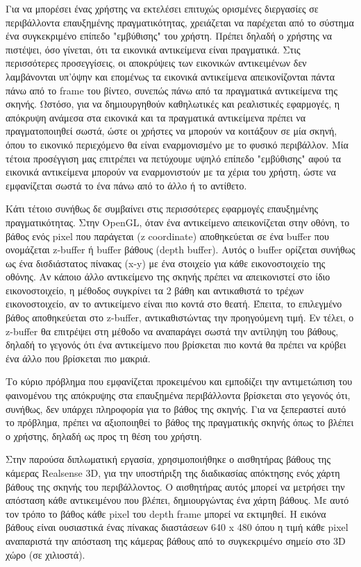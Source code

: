 Για να μπορέσει ένας χρήστης να εκτελέσει επιτυχώς ορισμένες διεργασίες σε περιβάλλοντα επαυξημένης πραγματικότητας, χρειάζεται να παρέχεται από το σύστημα ένα συγκεκριμένο επίπεδο "εμβύθισης" του χρήστη. Πρέπει δηλαδή ο χρήστης να πιστέψει, όσο γίνεται, ότι τα εικονικά αντικείμενα είναι πραγματικά. 
Στις περισσότερες προσεγγίσεις, οι αποκρύψεις των εικονικών αντικειμένων δεν λαμβάνονται υπ'όψην και επομένως τα εικονικά αντικείμενα απεικονίζονται πάντα πάνω από το frame του βίντεο, συνεπώς πάνω από τα πραγματικά αντικείμενα της σκηνής. 
Ωστόσο, για να δημιουργηθούν καθηλωτικές και ρεαλιστικές εφαρμογές, η απόκρυψη ανάμεσα στα εικονικά και τα πραγματικά αντικείμενα πρέπει να πραγματοποιηθεί σωστά, ώστε οι χρήστες να μπορούν να κοιτάξουν σε μία σκηνή, όπου το εικονικό περιεχόμενο θα είναι εναρμονισμένο με το φυσικό περιβάλλον. Μία τέτοια προσέγγιση μας επιτρέπει να πετύχουμε υψηλό επίπεδο "εμβύθισης" αφού τα εικονικά αντικείμενα μπορούν να εναρμονιστούν με τα χέρια του χρήστη, ώστε να εμφανίζεται σωστά το ένα πάνω από το άλλο ή το αντίθετο. 

Κάτι τέτοιο συνήθως δε συμβαίνει στις περισσότερες εφαρμογές επαυξημένης πραγματικότητας. Στην OpenGL, όταν ένα αντικείμενο απεικονίζεται στην οθόνη, το βάθος ενός pixel που παράγεται (z coordinate) αποθηκεύεται σε ένα buffer που ονομάζεται z-buffer ή buffer βάθους (depth buffer). Αυτός ο buffer ορίζεται συνήθως ως ένα δισδιάστατος πίνακας (x-y) με ένα στοιχείο για κάθε εικονοστοιχείο της οθόνης. Αν κάποιο άλλο αντικείμενο της σκηνής πρέπει να απεικονιστεί στο ίδιο εικονοστοιχείο, η μέθοδος συγκρίνει τα 2 βάθη και αντικαθιστά το τρέχων εικονοστοιχείο, αν το αντικείμενο είναι πιο κοντά στο θεατή. Έπειτα, το επιλεγμένο βάθος αποθηκεύεται στο z-buffer, αντικαθιστώντας την προηγούμενη τιμή. Εν τέλει, ο z-buffer θα επιτρέψει στη μέθοδο να αναπαράγει σωστά την αντίληψη του βάθους, δηλαδή το γεγονός ότι ένα αντικείμενο που βρίσκεται πιο κοντά θα πρέπει να κρύβει ένα άλλο που βρίσκεται πιο μακριά.


Το κύριο πρόβλημα που εμφανίζεται προκειμένου και εμποδίζει την αντιμετώπιση του φαινομένου της απόκρυψης στα επαυξημένα περιβάλλοντα βρίσκεται στο γεγονός ότι, συνήθως, δεν υπάρχει πληροφορία για το βάθος της σκηνής. Για να ξεπεραστεί αυτό το πρόβλημα, πρέπει να αξιοποιηθεί το βάθος της πραγματικής σκηνής όπως το βλέπει ο χρήστης, δηλαδή ως προς τη θέση του χρήστη. 

Στην παρούσα διπλωματική εργασία, χρησιμοποιήθηκε ο αισθητήρας βάθους της κάμερας Realsense 3D, για την υποστήριξη της διαδικασίας απόκτησης ενός χάρτη βάθους της σκηνής του περιβάλλοντος. O αισθητήρας αυτός μπορεί να μετρήσει την απόσταση κάθε αντικειμένου που βλέπει, δημιουργώντας ένα χάρτη βάθους. Με αυτό τον τρόπο το βάθος κάθε pixel του depth frame μπορεί να εκτιμηθεί. Η εικόνα βάθους είναι ουσιαστικά ένας πίνακας διαστάσεων 640 x 480  όπου η τιμή κάθε pixel αναπαριστά την απόσταση της κάμερας βάθους από το συγκεκριμένο σημείο στο 3D χώρο (σε χιλιοστά). 


